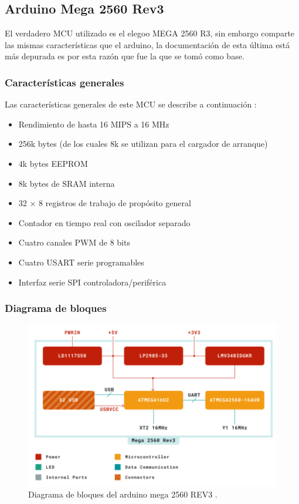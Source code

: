 \subsection*{Arduino Mega 2560 Rev3}
El verdadero MCU utilizado es el elegoo MEGA 2560 R3, sin embargo comparte las mismas características que el arduino, la documentación de esta última está más depurada es por esta razón que fue la que se tomó como base.

\subsubsection{Características generales}
Las características generales de este MCU se describe a continuación \cite{ArduinoMega}:
\begin{itemize}
    \item Rendimiento de hasta 16 MIPS a 16 MHz
    \item 256k bytes (de los cuales 8k se utilizan para el cargador de arranque)
    \item 4k bytes EEPROM
    \item 8k bytes de SRAM interna
    \item 32 × 8 registros de trabajo de propósito general
    \item Contador en tiempo real con oscilador separado
    \item Cuatro canales PWM de 8 bits
    \item Cuatro USART serie programables
    \item Interfaz serie SPI controladora/periférica
\end{itemize}

\subsubsection{Diagrama de bloques}
\begin{figure}[H]
    \centering
    \includegraphics[width=.6\linewidth]{Img/k1.png}
    \caption{ Diagrama de bloques del arduino mega 2560 REV3 \cite{ArduinoMega}.}
\end{figure}

